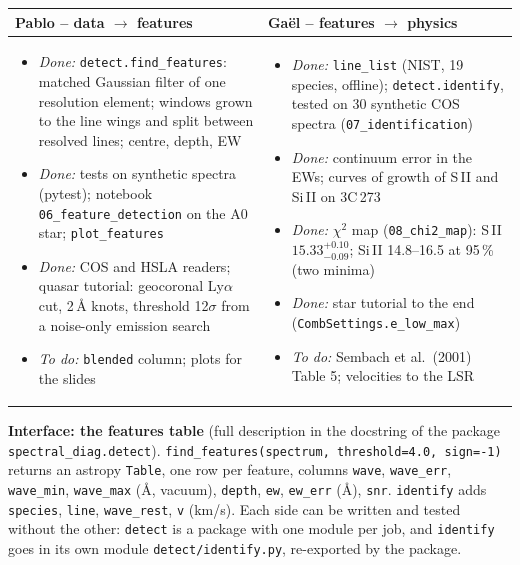 \documentclass[10pt,a4paper]{article}
\begin{document}
\begin{tabular}{@{}p{8.2cm}@{\hspace{0.4cm}}p{8.2cm}@{}}
\toprule
\textbf{Pablo -- data $\to$ features} & \textbf{Gaël -- features $\to$ physics}\\
\midrule
\begin{itemize}
\item \emph{Done:} \texttt{detect.find\_features}: matched Gaussian filter of one resolution element; windows grown to the line wings and split between resolved lines; centre, depth, EW
\item \emph{Done:} tests on synthetic spectra (pytest); notebook \texttt{06\_feature\_detection} on the A0 star; \texttt{plot\_features}
\item \emph{Done:} COS and HSLA readers; quasar tutorial: geocoronal Ly$\alpha$ cut, 2\,\AA{} knots, threshold 12$\sigma$ from a noise-only emission search
\item \emph{To do:} \texttt{blended} column; plots for the slides
\end{itemize}
&
\begin{itemize}
\item \emph{Done:} \texttt{line\_list} (NIST, 19 species, offline); \texttt{detect.identify}, tested on 30 synthetic COS spectra (\texttt{07\_identification})
\item \emph{Done:} continuum error in the EWs; curves of growth of S\,II and Si\,II on 3C\,273
\item \emph{Done:} $\chi^2$ map (\texttt{08\_chi2\_map}): S\,II $15.33^{+0.10}_{-0.09}$; Si\,II 14.8--16.5 at 95\,\% (two minima)
\item \emph{Done:} star tutorial to the end (\texttt{CombSettings.e\_low\_max})
\item \emph{To do:} Sembach et al.\ (2001) Table 5; velocities to the LSR
\end{itemize}\\
\bottomrule
\end{tabular}

\textbf{Interface: the features table} (full description in the docstring of the package \texttt{spectral\_diag.detect}). \texttt{find\_features(spectrum, threshold=4.0, sign=-1)} returns an astropy \texttt{Table}, one row per feature, columns \texttt{wave}, \texttt{wave\_err}, \texttt{wave\_min}, \texttt{wave\_max} (\AA, vacuum), \texttt{depth}, \texttt{ew}, \texttt{ew\_err} (\AA), \texttt{snr}. \texttt{identify} adds \texttt{species}, \texttt{line}, \texttt{wave\_rest}, \texttt{v} (km/s). Each side can be written and tested without the other: \texttt{detect} is a package with one module per job, and \texttt{identify} goes in its own module \texttt{detect/identify.py}, re-exported by the package.
\end{document}
